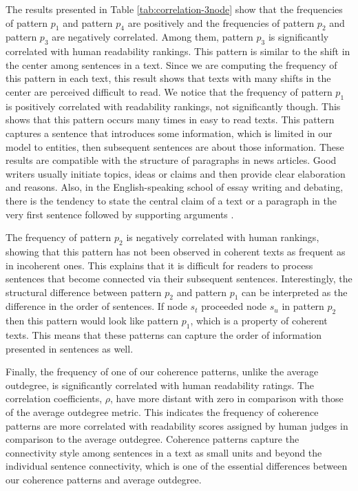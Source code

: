 The results presented in Table \ref{tab:correlation-3node} show that the frequencies of pattern $p_1$ and pattern $p_4$ are positively and the frequencies of pattern $p_2$ and pattern $p_3$ are negatively correlated. 
Among them, pattern $p_3$ is significantly correlated with human readability rankings. 
This pattern is similar to the shift in the center among sentences in a text. 
Since we are computing the frequency of this pattern in each text, this result shows that texts with many shifts in the center are perceived difficult to read. 
We notice that the frequency of pattern $p_1$ is positively correlated with readability rankings, not significantly though. 
This shows that this pattern occurs many times in easy to read texts.  
This pattern captures a sentence that introduces some information, which is limited in our model to entities, then  subsequent sentences are about those information. 
These results are compatible with the structure of paragraphs in news articles. 
Good writers usually initiate topics, ideas or claims and then provide clear elaboration and reasons. 
Also, in the English-speaking school of essay writing and debating, there is the tendency to state the central claim of a text or a paragraph in the very first sentence followed by supporting arguments \cite{peldszus15}. 

The frequency of pattern $p_2$ is negatively correlated with human rankings, showing that this pattern has not been observed in coherent texts as frequent as in incoherent ones. 
This explains that it is difficult for readers to process sentences that become connected via their  subsequent sentences.  
Interestingly, the structural difference between pattern $p_2$ and pattern $p_1$ can be interpreted as the difference in the order of sentences. 
If node $s_t$ proceeded node $s_u$ in pattern $p_2$ then this pattern would look like pattern $p_1$, which is a property of coherent texts. 
This means that these patterns can capture the order of information presented in sentences as well. 

Finally, the frequency of one of our coherence patterns, unlike the average outdegree, is significantly correlated with human readability ratings. 
The correlation coefficients, $\rho$, have more distant with zero in comparison with those of the average outdegree metric. 
This indicates the frequency of coherence patterns are more correlated with readability scores assigned by human judges in comparison to the average outdegree.  
Coherence patterns capture the connectivity style among sentences in a text as small units and beyond the individual sentence connectivity, which is one of the essential differences between our coherence patterns and average outdegree. 


